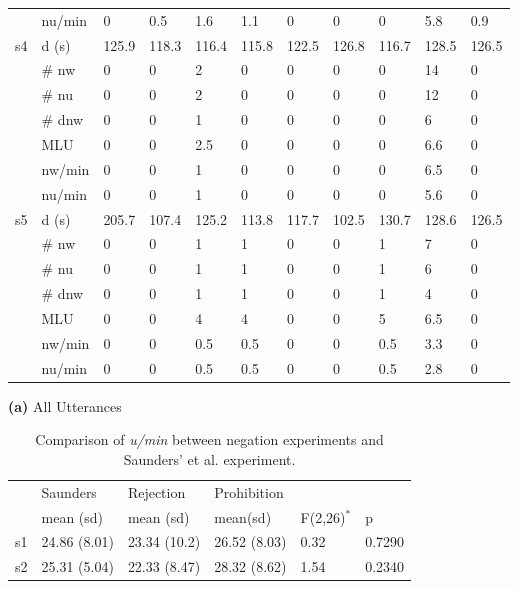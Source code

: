 \begin{screenonly}
\begin{table*}[h]
\begin{center}
\begin{tabular*}{\hsize}{@{\extracolsep{\fill}}lllllllllll}
      & nu/min & 0 & 0.5 & 1.6 & 1.1 & 0 & 0 & 0 & 5.8 & 0.9\\
      \cmidrule{2-11}
      \multirow{7}{*}{s4} & d (s) & 125.9 & 118.3 & 116.4 & 115.8 & 122.5 & 126.8 & 116.7 & 128.5 & 126.5\\
      & \# nw & 0 & 0 & 2 & 0 & 0 & 0 & 0 & 14 & 0\\
      & \# nu & 0 & 0 & 2 & 0 & 0 & 0 & 0 & 12 & 0\\
      & \# dnw & 0 & 0 & 1 & 0 & 0 & 0 & 0 & 6 & 0\\
      & MLU & 0 & 0 & 2.5 & 0 & 0 & 0 & 0 & 6.6 & 0\\
      & nw/min & 0 & 0 & 1 & 0 & 0 & 0 & 0 & 6.5 & 0\\
      & nu/min & 0 & 0 & 1 & 0 & 0 & 0 & 0 & 5.6 & 0\\
      \cmidrule{2-11}
      \multirow{7}{*}{s5} & d (s) & 205.7 & 107.4 & 125.2 & 113.8 & 117.7 & 102.5 & 130.7 & 128.6 & 126.5\\
      & \# nw & 0 & 0 & 1 & 1 & 0 & 0 & 1 & 7 & 0\\
      & \# nu & 0 & 0 & 1 & 1 & 0 & 0 & 1 & 6 & 0\\
      & \# dnw & 0 & 0 & 1 & 1 & 0 & 0 & 1 & 4 & 0\\
      & MLU & 0 & 0 & 4 & 4 & 0 & 0 & 5 & 6.5 & 0\\
      & nw/min & 0 & 0 & 0.5 & 0.5 & 0 & 0 & 0.5 & 3.3 & 0\\
      & nu/min & 0 & 0 & 0.5 & 0.5 & 0 & 0 & 0.5 & 2.8 & 0\\
      \bottomrule
    \end{tabular*}
  \end{center}
\end{table*}
\clearpage
\begin{table}[h]
  \caption{Comparison of \emph{u/min} between negation experiments and
    Saunders' et al. experiment.}
  \begin{minipage}[t][0.7cm][t]{9.5cm}
    {\small\textbf{(a)} All Utterances}\\
  \end{minipage}
  \setlength{\tabcolsep}{0.9ex}
  \begin{tabular}{llllll}
    \toprule
    & Saunders & Rejection & Prohibition \\
    & mean (sd) & mean (sd) & mean(sd) & F(2,26)$^*$ & p\\
    \midrule
    s1 & 24.86 (8.01) & 23.34 (10.2) & 26.52 (8.03) & 0.32 & 0.7290\\
    s2 & 25.31 (5.04) & 22.33 (8.47) & 28.32 (8.62) & 1.54 & 0.2340\\

\end{tabular}
\end{table}
\end{screenonly}
